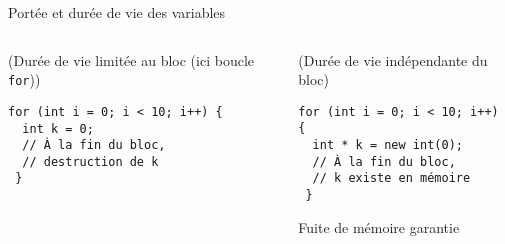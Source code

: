 \documentclass[c]{beamer}
\begin{document}
\begin{frame}[fragile]{Portée et durée de vie des variables}
 \begin{columns}
\begin{column}{0.6\columnwidth}
\begin{cbox}[][lwuc][\footnotesize](Durée de vie limitée au bloc (ici boucle \texttt{for}))
\begin{verbatim}
for (int i = 0; i < 10; i++) {
  int k = 0;
  // À la fin du bloc,
  // destruction de k
 }
\end{verbatim}

\pause
\end{cbox}
\end{column}

\begin{column}{0.6\columnwidth}
\begin{cbox}[][lwuc][\footnotesize](Durée de vie indépendante du bloc)
\begin{verbatim}
for (int i = 0; i < 10; i++) {
  int * k = new int(0);
  // À la fin du bloc,
  // k existe en mémoire
 }
\end{verbatim}

\begin{cbox}[5][lrtuc][\centering][9][11]
Fuite de mémoire garantie
\end{cbox}
\end{cbox}
\end{column}
\end{columns}
\end{frame}

\end{document}
